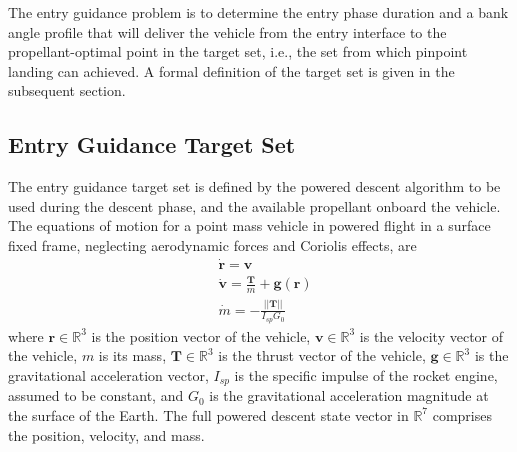 The entry guidance problem is to determine the entry phase duration and a bank angle profile that will deliver the vehicle from the entry interface to the propellant-optimal point in the target set, i.e., the set from which pinpoint landing can achieved. A formal definition of the target set is given in the subsequent section.

\subsection{Entry Guidance Target Set}
The entry guidance target set is defined by the powered descent algorithm to be used during the descent phase, and the available propellant onboard the vehicle. The equations of motion for a point mass vehicle in powered flight in a surface fixed frame, neglecting aerodynamic forces and Coriolis effects, are
\begin{align}
&\dot{\mathbf{r}} = \mathbf{v} \label{eq_eom_srp} \\
&\dot{\mathbf{v}} = \frac{\mathbf{T}}{m} + \mathbf{g}(\mathbf{r}) \\
&\dot{m} = -\frac{||\mathbf{T}||}{I_{sp}G_0} \label{eq_eom_srp_end}
\end{align}
where $\mathbf{r}\in\mathbb{R}^3$ is the position vector of the vehicle, $\mathbf{v}\in\mathbb{R}^3$ is the velocity vector of the vehicle, $m$ is its mass, $\mathbf{T}\in\mathbb{R}^3$ is the thrust vector of the vehicle, $\mathbf{g}\in\mathbb{R}^3$ is the gravitational acceleration vector, $I_{sp}$ is the specific impulse of the rocket engine, assumed to be constant, and $G_0$ is the gravitational acceleration magnitude at the surface of the Earth. The full powered descent state vector in $\mathbb{R}^7$ comprises the position, velocity, and mass. 

